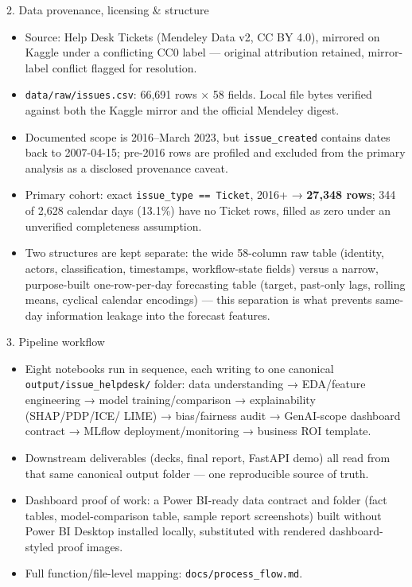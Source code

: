 \documentclass[
  ignorenonframetext,
]{beamer}
\providecommand{\tightlist}{%
  \setlength{\itemsep}{0pt}\setlength{\parskip}{0pt}}
\begin{document}
\begin{frame}[fragile]
\begin{block}{2. Data provenance, licensing \& structure}
\protect{}\label{2-data-provenance-licensing--structure}
\begin{itemize}
\tightlist
\item
  Source: Help Desk Tickets (Mendeley Data v2, CC BY 4.0), mirrored on
  Kaggle under a conflicting CC0 label --- original attribution
  retained, mirror-label conflict flagged for resolution.
\item
  \texttt{data/raw/issues.csv}: 66,691 rows × 58 fields. Local file
  bytes verified against both the Kaggle mirror and the official
  Mendeley digest.
\item
  Documented scope is 2016--March 2023, but \texttt{issue\_created}
  contains dates back to 2007-04-15; pre-2016 rows are profiled and
  excluded from the primary analysis as a disclosed provenance caveat.
\item
  Primary cohort: exact \texttt{issue\_type\ ==\ Ticket}, 2016+ →
  \textbf{27,348 rows}; 344 of 2,628 calendar days (13.1\%) have no
  Ticket rows, filled as zero under an unverified completeness
  assumption.
\item
  Two structures are kept separate: the wide 58-column raw table
  (identity, actors, classification, timestamps, workflow-state fields)
  versus a narrow, purpose-built one-row-per-day forecasting table
  (target, past-only lags, rolling means, cyclical calendar encodings)
  --- this separation is what prevents same-day information leakage into
  the forecast features.
\end{itemize}
\end{block}
\end{frame}

\begin{frame}[fragile]
\begin{block}{3. Pipeline workflow}
\protect{}\label{3-pipeline-workflow}
\begin{itemize}
\tightlist
\item
  Eight notebooks run in sequence, each writing to one canonical
  \texttt{output/issue\_helpdesk/} folder: data understanding →
  EDA/feature engineering → model training/comparison → explainability
  (SHAP/PDP/ICE/ LIME) → bias/fairness audit → GenAI-scope dashboard
  contract → MLflow deployment/monitoring → business ROI template.
\item
  Downstream deliverables (decks, final report, FastAPI demo) all read
  from that same canonical output folder --- one reproducible source of
  truth.
\item
  Dashboard proof of work: a Power BI-ready data contract and folder
  (fact tables, model-comparison table, sample report screenshots) built
  without Power BI Desktop installed locally, substituted with rendered
  dashboard-styled proof images.
\item
  Full function/file-level mapping: \texttt{docs/process\_flow.md}.
\end{itemize}
\end{block}
\end{frame}
\end{document}
